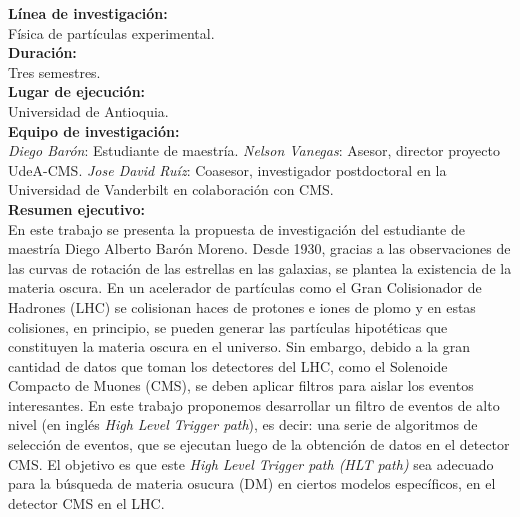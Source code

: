 \textbf{Línea de investigación:}\\
Física de partículas experimental.
\\

\textbf{Duración:}\\
Tres semestres.
\\

\textbf{Lugar de ejecución:}\\
Universidad de Antioquia.
\\

\textbf{Equipo de investigación:}\\
\emph{Diego Barón}: Estudiante de maestría.
\emph{Nelson Vanegas}: Asesor, director proyecto UdeA-CMS.
\emph{Jose David Ruíz}: Coasesor, investigador postdoctoral en la Universidad de Vanderbilt en colaboración con CMS.
\\

\textbf{Resumen ejecutivo:}\\
En este trabajo se presenta la propuesta de investigación del estudiante de maestría Diego Alberto Barón Moreno. Desde 1930, gracias a las observaciones de las curvas de rotación de las estrellas en las galaxias, se plantea la existencia de la materia oscura. En un acelerador de partículas como el Gran Colisionador de Hadrones (LHC) se colisionan haces de protones e iones de plomo y en estas colisiones, en principio, se pueden generar las partículas hipotéticas que constituyen la materia oscura en el universo. Sin embargo, debido a la gran cantidad de datos que toman los detectores del LHC, como el Solenoide Compacto de Muones (CMS)\cite{Bayatian:2006nff}, se deben aplicar filtros para aislar los eventos interesantes. En este trabajo proponemos desarrollar un filtro de eventos de alto nivel (en inglés \textit{High Level Trigger path}), es decir: una serie de algoritmos de selección de eventos, que se ejecutan luego de la obtención de datos en el detector CMS. El objetivo es que este \textit{High Level Trigger path (HLT path)} sea adecuado para la búsqueda de materia osucura (DM) en ciertos modelos específicos, en el detector CMS en el LHC.


\newpage























